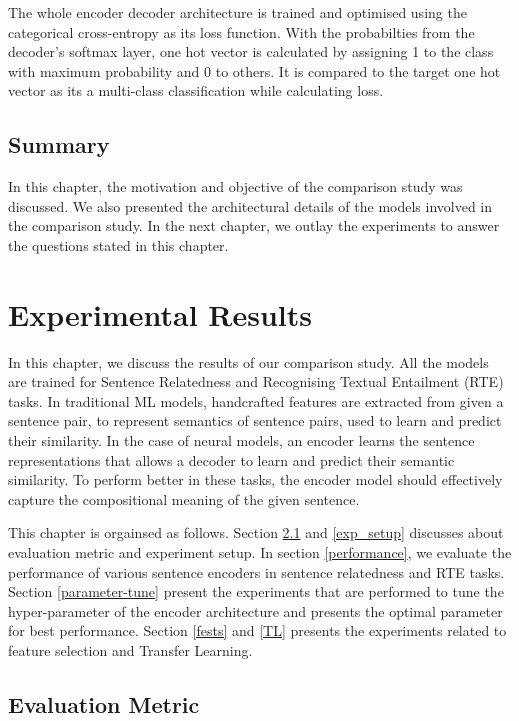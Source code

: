\documentclass[12pt]{report} %
\begin{document}
	The whole encoder decoder architecture is trained  and optimised using the categorical cross-entropy as its loss function. With the probabilties from the decoder's softmax layer, one hot vector is calculated by assigning 1 to the class with maximum probability and 0 to others. It is compared to the target one hot vector as its a multi-class classification while calculating loss.
	
	\section{Summary}
	In this chapter, the motivation and objective of the comparison study was discussed. We also presented the architectural details of the models involved in the comparison study. In the next chapter, we outlay the experiments to answer the questions stated in this chapter.
	
	  
	 
\chapter{Experimental Results}
\label{results}

 In this chapter, we discuss the results of our comparison study. All the models are trained for Sentence Relatedness and Recognising Textual Entailment (RTE) tasks. In traditional ML models, handcrafted features are extracted from given a sentence pair, to represent semantics of sentence pairs, used to learn and predict their similarity. In the case of neural models, an encoder learns the sentence representations that allows a decoder to learn and predict their semantic similarity. %
 To perform better in these tasks, the encoder model should effectively capture the compositional meaning of the given sentence. 
 
 This chapter is orgainsed as follows. Section \ref{eval} and \ref{exp_setup} discusses about evaluation metric and experiment setup. In section \ref{performance}, we evaluate the performance of various sentence encoders in sentence relatedness and RTE tasks. Section \ref{parameter-tune} present the experiments that are performed to tune the hyper-parameter of the encoder architecture and presents the optimal parameter for best performance. Section \ref{fests} and \ref{TL} presents the experiments related to feature selection and Transfer Learning.
 
 \section{Evaluation Metric}
 \label{eval}
 
\end{document}
